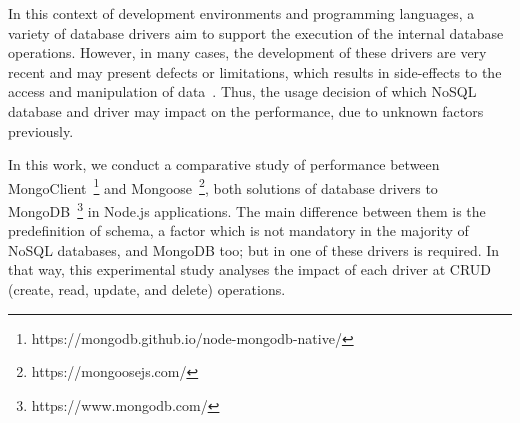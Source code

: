 \documentclass{svproc}
\begin{document}
In this context of development environments and programming languages, a variety of database drivers aim to support the execution of the internal database operations.
However, in many cases, the development of these drivers are very recent and may present defects or limitations, which results in side-effects to the access and manipulation of data~\cite{rafique:2018}.
Thus, the usage decision of which NoSQL database and driver may impact on the performance, due to unknown factors previously.


In this work, we conduct a comparative study of performance between MongoClient~\footnote{https://mongodb.github.io/node-mongodb-native/} and Mongoose~\footnote{https://mongoosejs.com/}, both solutions of database drivers to MongoDB~\footnote{https://www.mongodb.com/} in Node.js applications.
The main difference between them is the predefinition of schema, a factor which is not mandatory in the majority of NoSQL databases, and MongoDB too; but in one of these drivers is required.
In that way, this experimental study analyses the impact of each driver at CRUD (create, read, update, and delete) operations. 
\end{document}

